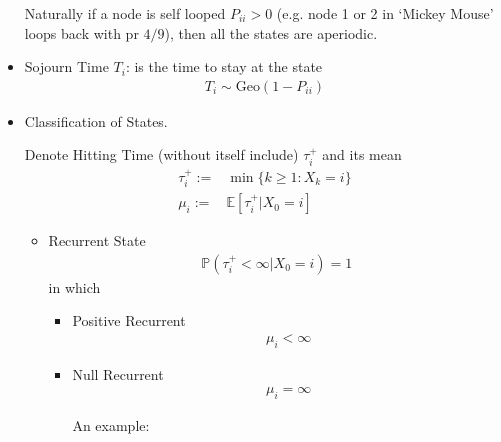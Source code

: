 \begin{itemize}[topsep=2pt,itemsep=0pt]
        Naturally if a node is self looped $ P_{ii}>0 $ (e.g. node 1 or 2 in `Mickey Mouse' loops back with pr $ 4/9 $), then all the states are aperiodic.
        \item Sojourn Time $ T_i $: is the time to stay at the state
        \begin{align*}
            T_i\sim \mathrm{Geo}(1-P_{ii})  
        \end{align*}
        \item Classification of States. 
        
        Denote Hitting Time (without itself include) $ \tau_i^+ $ and its mean 
        \begin{align*}
            \tau_i^+:=&\min\{k\geq 1:X_k=i\}\\
            \mu _i:=&\mathbb{E}\left[ \tau_i^+|X_0=i \right] 
        \end{align*}
        
        \begin{itemize}[topsep=2pt,itemsep=0pt]
            \item Recurrent State
            \begin{align*}
                \mathbb{P}\left( \tau_i^+<\infty|X_0=i    \right)=1  
            \end{align*}
            in which 
            \begin{itemize}[topsep=2pt,itemsep=0pt]
                \item Positive Recurrent
                \begin{align*}
                    \mu _i<\infty 
                \end{align*}
                \item Null Recurrent
                \begin{align*}
                    \mu _i=\infty 
                \end{align*}

                An example:
                \begin{center}
\end{center}
\end{itemize}
\end{itemize}
\end{itemize}
